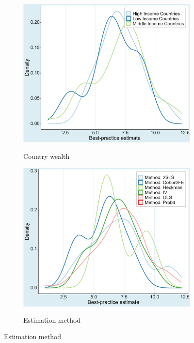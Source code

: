 \begin{figure}[!htbp]
\begin{center}
    \begin{subfigure}[!htbp]{0.38\textwidth}
      \vspace{0.2cm}
      \caption{Country wealth}
      \vspace{-0.1cm}
      \includegraphics[width=0.95\linewidth]{Figures/BPE/bpe_income.png}
      \label{fig:bpe_income}
    \end{subfigure}
    \begin{subfigure}[!htbp]{0.38\textwidth}
      \vspace{0.2cm}
      \caption{Estimation method}
      \vspace{-0.1cm}
      \includegraphics[width=0.95\linewidth]{Figures/BPE/bpe_method.png}
      \label{fig:bpe_method}
    \end{subfigure}


\end{center}
\end{figure}
